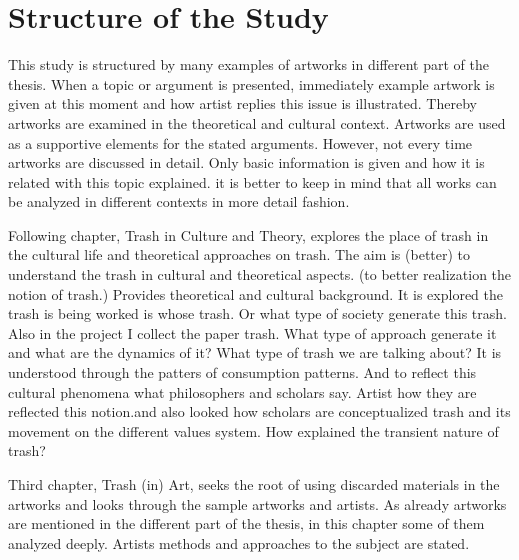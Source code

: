 \section{Structure of the Study}
This study is structured by many examples of artworks in different part of the thesis. When a topic or argument is presented, immediately example artwork is given at this moment and how artist replies this issue is illustrated. Thereby artworks are examined in the theoretical and cultural context. Artworks are used as a supportive elements for the stated arguments.  However, not every time artworks are discussed in detail. Only basic information is given and how it is related with this topic explained.  it is better to keep in mind that all works can be analyzed in different contexts in more detail fashion.

Following chapter, Trash in Culture and Theory, explores the place of trash in the cultural life and theoretical approaches on trash. The aim is (better) to understand the trash in cultural and theoretical aspects. (to better realization the notion of trash.) Provides theoretical and cultural background. It is explored the trash is being worked is whose trash. Or what type of society generate this trash. Also in the project I collect the paper trash. What type of approach generate it and what are the dynamics of it? What type of trash we are talking about? It is understood through the patters of consumption patterns. And to reflect this cultural phenomena what philosophers and scholars say. Artist how they are reflected this notion.and also looked how scholars are conceptualized trash and its movement on the different values system. How explained the transient nature of trash?

Third chapter, Trash (in) Art, seeks the root of using discarded materials in the artworks and looks through the sample artworks and artists. As already artworks are mentioned in the different part of the thesis, in this chapter some of them analyzed deeply. Artists methods and approaches to the subject are stated.


